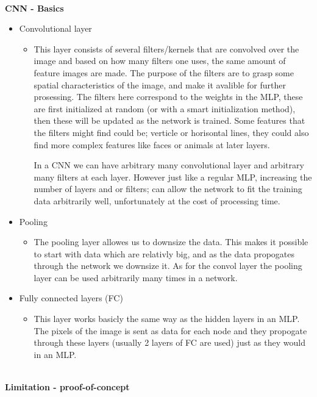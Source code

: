 \documentclass[11pt,a4paper,UKenglish]{article}
\begin{document}
\noindent \\ \textbf{CNN - Basics}
\begin{itemize}
 \item{Convolutional layer}
 \begin{itemize}
  \item{This layer consists of several filters/kernels that are convolved over
  the image and based on how many filters one uses, the same amount of feature
  images are made. The purpose of the filters are to grasp some spatial
  characteristics of the image, and make it avalible for further prosessing.
  The filters here correspond to the weights in the MLP, these are first
  initialized at random (or with a smart initialization method), then these
  will be updated as the network is trained. Some features that the filters
  might find could be; verticle or horisontal lines, they could also find more
  complex features like faces or animals at later layers. \par
  In a CNN we can have arbitrary many convolutional layer and arbitrary many
  filters at each layer. However just like a regular MLP, increasing the
  number of layers and or filters; can allow the network to fit the training
  data arbitrarily well, unfortunately at the cost of processing time.}
 \end{itemize}
 \item{Pooling}
 \begin{itemize}
  \item{The pooling layer allowes us to downsize the data. This makes it
  possible to start with data which are relativly big, and as the data propogates
  through the network we downsize it. As for the convol layer the pooling
  layer can be used arbitrarily many times in a network.}
 \end{itemize}
 \item{Fully connected layers (FC)}
 \begin{itemize}
  \item{This layer works basicly the same way as the hidden layers in an MLP.
  The pixels of the image is sent as data for each node and they propogate
  through these layers (usually 2 layers of FC are used) just as they would in
  an MLP.}
 \end{itemize}
\end{itemize}

\noindent \\ \textbf{Limitation - proof-of-concept}
\end{document}

